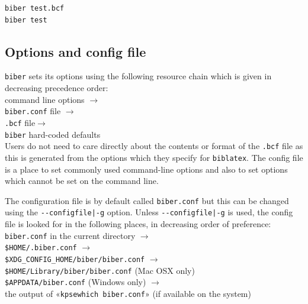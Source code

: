 \documentclass{ltxdockit}
\begin{document}
\begin{verbatim}
biber test.bcf
biber test
\end{verbatim}

\subsection{Options and config file}
\verb+biber+ sets its options using the following resource 
chain which is given in decreasing precedence order:\\[2ex]

\noindent command line options $\rightarrow$\\
\hspace*{1em}\verb+biber.conf+ file $\rightarrow$\\
\hspace*{2em}\verb+.bcf+ file$\rightarrow$\\
\hspace*{3em}\verb+biber+ hard-coded defaults\\[2ex]

\noindent Users do not need to care directly about the contents or format of the
\verb+.bcf+ file as this is generated from the options which they specify
for \verb+biblatex+. The config file is a place to set commonly used
command-line options and also to set options which cannot be set on the
command line.

The configuration file is by default called \verb+biber.conf+ but this can
be changed using the \verb+--configfile|-g+ option. Unless
\verb+--configfile|-g+ is used, the config file is
looked for in the following places, in decreasing order of preference:\\[2ex]

\noindent \verb+biber.conf+ in the current directory $\rightarrow$\\
\hspace*{1em}\verb+$HOME/.biber.conf+ $\rightarrow$\\
\hspace*{2em}\verb+$XDG_CONFIG_HOME/biber/biber.conf+ $\rightarrow$\\
\hspace*{3em}\verb+$HOME/Library/biber/biber.conf+ (Mac OSX only)\\
\hspace*{3em}\verb+$APPDATA/biber.conf+ (Windows only) $\rightarrow$\\
\hspace*{4em}the output of «\verb+kpsewhich biber.conf+» (if available on the
system)\\[2ex]
\end{document}
